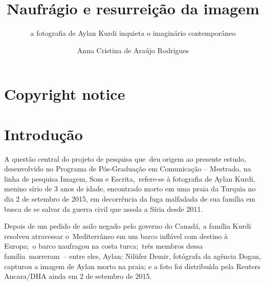 \documentclass[
  letterpaper,
]{scrbook}
\title{Naufrágio e resurreição da imagem}
\subtitle{a fotografia de Aylan Kurdi inquieta o imaginário
contemporâneo}
\author{Anna Cristina de Araújo Rodrigues}
\date{}
\renewcommand*\contentsname{Índice}
\newcommand\contentsname{Índice}
\begin{document}
\frontmatter
\maketitle
\ifdefined\Shaded\renewenvironment{Shaded}{\begin{tcolorbox}[sharp corners, interior hidden, breakable, borderline west={3pt}{0pt}{shadecolor}, enhanced, boxrule=0pt, frame hidden]}{\end{tcolorbox}}\fi

\renewcommand*\contentsname{Sumário}
{
\setcounter{tocdepth}{2}
\tableofcontents
}
\mainmatter
{}

\hypertarget{copyright-notice}{%
\chapter*{Copyright notice}\label{copyright-notice}}



\hypertarget{introduuxe7uxe3o}{%
\chapter{Introdução}\label{introduuxe7uxe3o}}

A questão central do projeto de pesquisa que~deu origem ao presente
estudo, desenvolvido no Programa de Pós-Graduação em Comunicação --
Mestrado, na linha de pesquisa Imagem, Som e Escrita,~refere-se à
fotografia de Aylan Kurdi, menino sírio de 3 anos de idade, encontrado
morto em uma praia da Turquia no dia 2 de setembro de 2015, em
decorrência da fuga malfadada de sua família em busca de se salvar da
guerra civil que assola a Síria desde 2011.~

Depois de um pedido de asilo negado pelo governo do Canadá, a família
Kurdi resolveu atravessar o~Mediterrâneo em um barco inflável com
destino à Europa;~o barco naufragou na costa turca;~três membros dessa
família~morreram~-- entre eles, Aylan; Nilüfer Demir, fotógrafa da
agência Dogan, capturou a imagem de Aylan morto na praia; e a foto foi
distribuída pela Reuters Ancara/DHA ainda em 2 de setembro de 2015.
\end{document}
